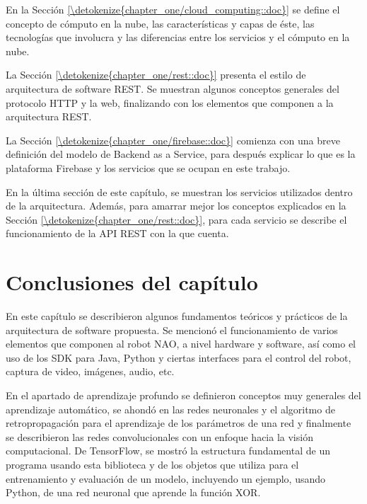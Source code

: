 \documentclass[letterpaper,12pt,spanish]{report}
\begin{document}
En la Sección \ref{\detokenize{chapter_one/cloud_computing::doc}}
se define el concepto de cómputo en la nube, las 
características y capas de éste, 
las tecnologías que involucra y las diferencias entre los 
servicios y el cómputo en la nube.

La Sección \ref{\detokenize{chapter_one/rest::doc}}
presenta el estilo de arquitectura de software REST.
Se muestran algunos conceptos generales del protocolo
HTTP y la web, finalizando con los elementos 
que componen a la arquitectura REST.

La Sección \ref{\detokenize{chapter_one/firebase::doc}}
comienza con una breve definición del modelo 
de Backend as a Service, para después
explicar lo que es la plataforma Firebase y los servicios
que se ocupan en este trabajo.

En la última sección de este capítulo, se muestran los 
servicios utilizados dentro de la arquitectura. Además,
para amarrar mejor los conceptos explicados 
en la Sección \ref{\detokenize{chapter_one/rest::doc}},
para cada servicio se describe el funcionamiento
de la API REST con la que cuenta.









\section*{Conclusiones del capítulo}
En este capítulo se describieron algunos 
fundamentos teóricos y prácticos de la arquitectura de software 
propuesta. Se mencionó el funcionamiento de varios elementos que 
componen al robot NAO, a nivel hardware y software, así como el uso de los SDK para Java, Python y
ciertas interfaces para el control del robot, captura de 
video, imágenes, audio, etc. 

En el apartado de aprendizaje profundo se definieron 
conceptos muy generales del aprendizaje automático,
se ahondó en las redes neuronales y el algoritmo de 
retropropagación para el aprendizaje de los parámetros
de una red y finalmente se describieron las redes
convolucionales con un enfoque hacia la visión 
computacional. De TensorFlow, se mostró 
la estructura fundamental de un programa usando esta
biblioteca y de los objetos que utiliza
para el entrenamiento y evaluación de un modelo, 
incluyendo un ejemplo, usando Python, de una
red neuronal que aprende la función XOR. 
\end{document}
